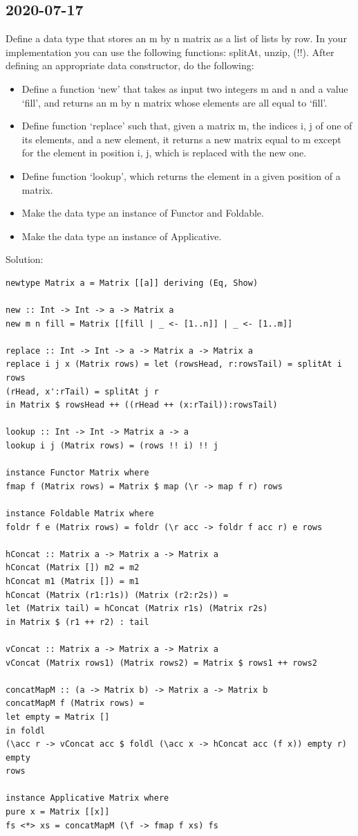 \subsection{2020-07-17}
Define a data type that stores an m by n matrix as a list of lists by row.
In your implementation you can use the following functions: splitAt, unzip, (!!).
After defining an appropriate data constructor, do the following:
\begin{itemize}
	\item Define a function `new' that takes as input two integers m and n and a value `fill', and returns an m by n matrix whose elements are all equal to `fill'.
	\item Define function `replace' such that, given a matrix m, the indices i, j of one of its elements, and a new element, it returns a new matrix equal to m except for the element in position i, j, which is replaced with the new one.
	\item Define function `lookup', which returns the element in a given position of a matrix.
	\item Make the data type an instance of Functor and Foldable.
	\item Make the data type an instance of Applicative.
\end{itemize}
Solution:
\begin{lstlisting}
newtype Matrix a = Matrix [[a]] deriving (Eq, Show)

new :: Int -> Int -> a -> Matrix a
new m n fill = Matrix [[fill | _ <- [1..n]] | _ <- [1..m]]

replace :: Int -> Int -> a -> Matrix a -> Matrix a
replace i j x (Matrix rows) = let (rowsHead, r:rowsTail) = splitAt i rows
(rHead, x':rTail) = splitAt j r
in Matrix $ rowsHead ++ ((rHead ++ (x:rTail)):rowsTail)

lookup :: Int -> Int -> Matrix a -> a
lookup i j (Matrix rows) = (rows !! i) !! j

instance Functor Matrix where
fmap f (Matrix rows) = Matrix $ map (\r -> map f r) rows

instance Foldable Matrix where
foldr f e (Matrix rows) = foldr (\r acc -> foldr f acc r) e rows

hConcat :: Matrix a -> Matrix a -> Matrix a
hConcat (Matrix []) m2 = m2
hConcat m1 (Matrix []) = m1
hConcat (Matrix (r1:r1s)) (Matrix (r2:r2s)) =
let (Matrix tail) = hConcat (Matrix r1s) (Matrix r2s)
in Matrix $ (r1 ++ r2) : tail

vConcat :: Matrix a -> Matrix a -> Matrix a
vConcat (Matrix rows1) (Matrix rows2) = Matrix $ rows1 ++ rows2

concatMapM :: (a -> Matrix b) -> Matrix a -> Matrix b
concatMapM f (Matrix rows) =
let empty = Matrix []
in foldl
(\acc r -> vConcat acc $ foldl (\acc x -> hConcat acc (f x)) empty r)
empty
rows

instance Applicative Matrix where
pure x = Matrix [[x]]
fs <*> xs = concatMapM (\f -> fmap f xs) fs
\end{lstlisting}





